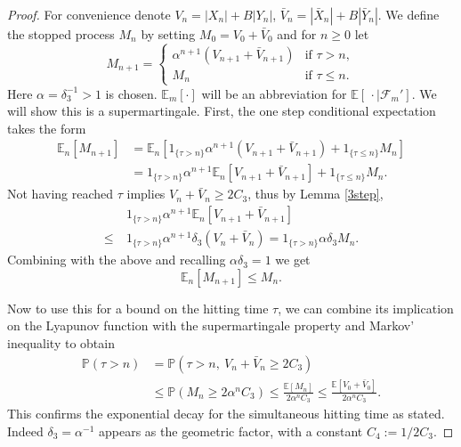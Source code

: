 \documentclass{article}
\def\mE{\mathbb{E}}
\def\mP{\mathbb{P}}
\begin{document}
\begin{proof}
    For convenience denote $V_n = |X_n|+B|Y_n|$, $\bar V_n = |\bar X_n|+B|\bar Y_n|$.
%
We define the stopped process $M_n$ by setting $M_0 = V_0+\bar V_0$ and for $n\geq 0$ let
\[
M_{n+1} = \begin{cases}
    \alpha^{n+1} (V_{n+1}+\bar V_{n+1}) & \text{if }\tau>n,\\
    M_n & \text{if } \tau\leq n.
\end{cases}
\]
Here $\alpha=\delta_3^{-1}>1$ is chosen.
$\mathbb{E}_{m}[\cdot]$ will be an abbreviation
for $\mathbb{E}[\,\cdot\mid \mathcal{F}_{m}']$.
We will show this is a supermartingale. First, the one step conditional expectation takes the form
\begin{align*}
\mE_n[M_{n+1}] &= \mE_n[1_{\{\tau>n\}}\alpha^{n+1} (V_{n+1}+\bar V_{n+1}) + 1_{\{\tau\leq n\}}M_n]\\ 
&= 1_{\{\tau>n\}}\alpha^{n+1} \mE_n[V_{n+1}+\bar V_{n+1}] + 1_{\{\tau\leq n\}}M_n.
\end{align*}
Not having reached $\tau$ implies $V_n+\bar V_n\geq 2C_3$, 
thus by Lemma \ref{3step},
\begin{align*}
  &1_{\{\tau>n\}}\alpha^{n+1} \mE_n[V_{n+1}+\bar V_{n+1}]\\
  \leq~ &1_{\{\tau>n\}}\alpha^{n+1} \delta_3(V_{n}+\bar V_{n}) = 1_{\{\tau>n\}}\alpha \delta_3 M_n.
\end{align*}
Combining with the above and recalling $\alpha\delta_3=1$ we get
\[
\mE_n[M_{n+1}]\leq M_n.
\]

Now to use this for a bound on the hitting time $\tau$, we can combine its 
implication on the Lyapunov function with the supermartingale property and Markov' inequality to obtain
\begin{align*}
\mP(\tau>n)&= \mP(\tau>n,~V_n+\bar V_n\geq 2C_3)\\ &\leq
\mP(M_n\geq 2\alpha^n C_3) \leq \frac{\mathbb{E}[M_n]}{2\alpha^n C_3}\leq \frac{\mathbb{E}[V_0+\bar V_0]}{2\alpha^n C_3}.
\end{align*}
This confirms the exponential decay for the simultaneous hitting time as stated. 
Indeed $\delta_3 = \alpha^{-1}$ appears as the geometric factor, with a constant $C_4:=1/2C_3$.
\end{proof}
\end{document}
